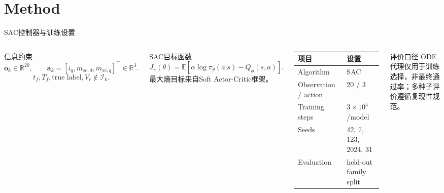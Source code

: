 \documentclass[10pt,aspectratio=169,mathserif]{beamer}
\begin{document}
\section{Method}

\begin{frame}{SAC控制器与训练设置}
\begin{columns}[T,onlytextwidth]
\begin{block}{信息约束}
\[
\bm o_k\in\mathbb R^{20},\qquad
\bm a_k=[i_q,m_{se,d},m_{se,q}]^\top\in\mathbb R^3.
\]
\[
t_f,T_f,\text{true label},V_r\notin \mathcal I_k.
\]
\end{block}

\begin{block}{SAC目标函数}
\[
J_\pi(\theta)=
\mathbb E[\alpha\log\pi_\theta(a|s)-Q_\phi(s,a)].
\]
最大熵目标来自Soft Actor-Critic框架\cite{haarnoja_sac}。
\end{block}

\begin{table}
\centering\small
\begin{tabular}{ll}
\toprule
项目 & 设置 \\
\midrule
Algorithm & SAC \\
Observation / action & 20 / 3 \\
Training steps & $3\times10^5$/model \\
Seeds & 42, 7, 123, 2024, 31 \\
Evaluation & held-out family split \\
\bottomrule
\end{tabular}
\end{table}

\begin{block}{评价口径}
ODE代理仅用于训练选择，非最终通过率；多种子评价遵循复现性规范\cite{henderson_drl,agarwal_precipice}。
\end{block}
\end{columns}
\end{frame}
\end{document}
